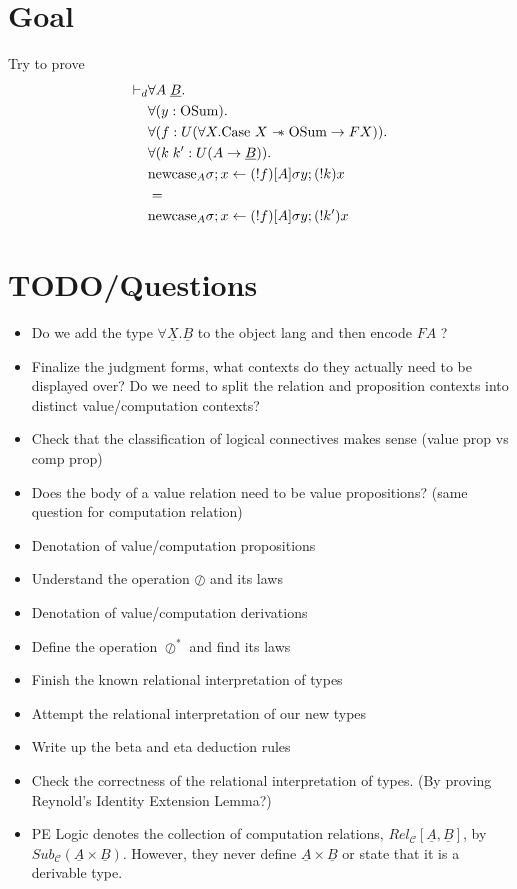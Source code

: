 \documentclass{article}
\begin{document}
\section{Goal}
Try to prove 
\begin{align*}
    \vdash_d & \forall A \;\underline{B}. \\
    & \forall (y : \textrm{OSum}). \\
    & \forall (f : U(\forall X . \textrm{Case }X \mathrel{-\mkern-6mu*} \textrm{OSum} \rightarrow F X)). \\
    & \forall (k \; k' : U(A \rightarrow \underline{B})). \\
    & \textrm{newcase}_A \sigma ; x \leftarrow (!f)[A]\sigma y ; (!k) x  \\
    & = \\
    & \textrm{newcase}_A \sigma ; x \leftarrow (!f)[A]\sigma y ; (!k') x  
\end{align*}   

\section{TODO/Questions}
\begin{itemize}
    \item Do we add the type $\forall \underline{X}. \underline{B}$ to the object lang and then encode $F A$ ?
    \item Finalize the judgment forms, what contexts do they actually need to be displayed over? Do we need to split the relation and proposition contexts into distinct value/computation contexts?
    \item Check that the classification of logical connectives makes sense (value prop vs comp prop)
    \item Does the body of a value relation need to be value propositions? (same question for computation relation)
    \item Denotation of value/computation propositions
    \item Understand the operation $\oslash$ and its laws
    \item Denotation of value/computation derivations 
    \item Define the operation $\oslash^*$ and find its laws
    \item Finish the known relational interpretation of types
    \item Attempt the relational interpretation of our new types
    \item Write up the beta and eta deduction rules 
    \item Check the correctness of the relational interpretation of types. (By proving Reynold's Identity Extension Lemma?)
    \item PE Logic denotes the collection of computation relations, $Rel_{\mathcal{C}}[\underline{A},\underline{B}]$, by $Sub_{\mathcal{C}}(\underline{A} \times \underline{B})$. However,
          they never define $\underline{A} \times \underline{B}$ or state that it is a derivable type.
\end{itemize}
\end{document}
